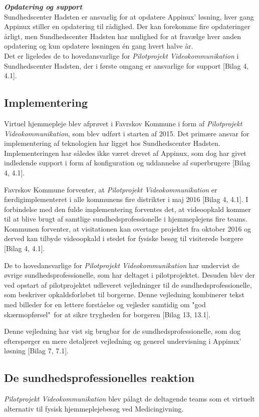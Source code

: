 \textit{\textbf{Opdatering og support}}\\
Sundhedscenter Hadsten er ansvarlig for at opdatere Appinux' løsning, hver gang Appinux stiller en opdatering til rådighed. Der kan forekomme fire opdateringer årligt, men Sundhedscenter Hadsten har mulighed for at fravælge hver anden opdatering og kun opdatere løsningen én gang hvert halve år.\\
Det er ligeledes de to hovedansvarlige for \textit{Pilotprojekt Videokommunikation} i Sundhedscenter Hadsten, der i første omgang er ansvarlige for support [Bilag 4, 4.1]. 

\subsection{Implementering}
Virtuel hjemmepleje blev afprøvet i Favrskov Kommune i form af \textit{Pilotprojekt Videokommunikation}, som blev udført i starten af 2015. Det primære ansvar for implementering af teknologien har ligget hos Sundhedscenter Hadsten. Implementeringen har således ikke været drevet af Appinux, som dog har givet indledende support i form af konfiguration og uddannelse af superbrugere [Bilag 4, 4.1].

Favrskov Kommune forventer, at \textit{Pilotprojekt Videokommunikation} er færdigimplementeret i alle kommunens fire distrikter i maj 2016 [Bilag 4, 4.1]. I forbindelse med den fulde implementering forventes det, at videoopkald kommer til at blive brugt af samtlige sundhedsprofessionelle i hjemmeplejens fire teams. Kommunen forventer, at visitationen kan overtage projektet fra oktober 2016 og derved kan tilbyde videoopkald i stedet for fysiske besøg til visiterede borgere [Bilag 4, 4.1].

De to hovedansvarlige for \textit{Pilotprojekt Videokommunikation} har undervist de øvrige sundhedsprofessionelle, som har deltaget i pilotprojektet. Desuden blev der ved opstart af pilotprojektet udleveret vejledninger til de sundhedsprofessionelle, som beskriver opkaldsforløbet til borgerne. Denne vejledning kombinerer tekst med billeder for en lettere forståelse og vejleder samtidig om "god skærmopførsel"\ for at sikre trygheden for borgeren [Bilag 13, 13.1].  

Denne vejledning har vist sig brugbar for de sundhedsprofessionelle, som dog efterspørger en mere detaljeret vejledning og generel undervisning i Appinux' løsning [Bilag 7, 7.1].

 
\subsection{De sundhedsprofessionelles reaktion}
\textit{Pilotprojekt Videokommunikation} blev pålagt de deltagende teams som et virtuelt alternativ til fysisk hjemmeplejebesøg ved Medicingivning. 

